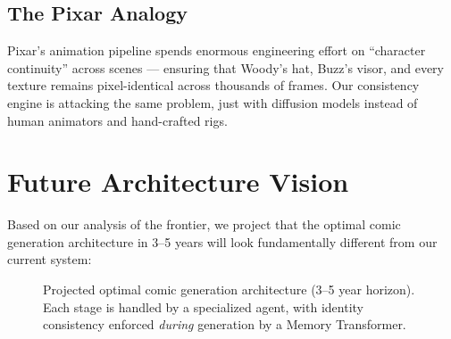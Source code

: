 \documentclass[11pt,a4paper,twocolumn]{article}
\begin{document}
\subsection{The Pixar Analogy}

Pixar's animation pipeline spends enormous engineering effort on ``character continuity'' across scenes --- ensuring that Woody's hat, Buzz's visor, and every texture remains pixel-identical across thousands of frames. Our consistency engine is attacking the same problem, just with diffusion models instead of human animators and hand-crafted rigs.

\section{Future Architecture Vision}
\label{sec:future}

Based on our analysis of the frontier, we project that the optimal comic generation architecture in 3--5 years will look fundamentally different from our current system:

\begin{figure}[H]
\centering
{}
\caption{Projected optimal comic generation architecture (3--5 year horizon). Each stage is handled by a specialized agent, with identity consistency enforced \textit{during} generation by a Memory Transformer.}
\label{fig:future_arch}
\end{figure}
\end{document}
